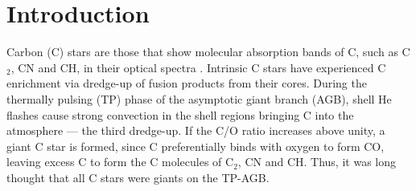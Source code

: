 \documentclass[twocolumn]{aastex631}
\begin{document}


\section{Introduction}\label{sec:intro}

Carbon (C) stars are those that show molecular absorption bands of C, such as C$_2$, CN and CH, in their optical spectra \citep{Secchi1869}. Intrinsic C stars have experienced C enrichment via dredge-up of fusion products from their cores. During the thermally pulsing (TP) phase of the asymptotic giant branch (AGB), shell He flashes cause strong convection in the shell regions bringing C into the atmosphere --- the third dredge-up. If the C/O ratio increases above unity, a giant C star is formed, since C preferentially binds with oxygen to form CO, leaving excess C to form the C molecules of C$_2$, CN and CH. Thus, it was long thought that all C stars were giants on the TP-AGB.
\end{document}
